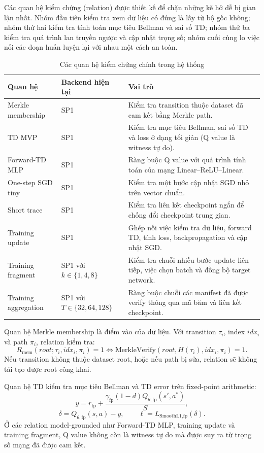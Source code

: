\documentclass[12pt,a4paper,oneside]{report}
\begin{document}
Các quan hệ kiểm chứng (relation) được thiết kế để chặn những kẽ hở dễ bị gian lận nhất. Nhóm đầu tiên kiểm tra xem dữ liệu có đúng là lấy từ bộ gốc không; nhóm thứ hai kiểm tra tính toán mục tiêu Bellman và sai số TD; nhóm thứ ba kiểm tra quá trình lan truyền ngược và cập nhật trọng số; nhóm cuối cùng lo việc nối các đoạn huấn luyện lại với nhau một cách an toàn.

\begin{table}[H]
\centering
\caption{Các quan hệ kiểm chứng chính trong hệ thống}
\begin{tabularx}{\textwidth}{p{} p{} p{}}
\toprule
Quan hệ & Backend hiện tại & Vai trò \\
\midrule
Merkle membership & SP1 & Kiểm tra transition thuộc dataset đã cam kết bằng Merkle path. \\
TD MVP & SP1 & Kiểm tra mục tiêu Bellman, sai số TD và loss ở dạng tối giản (Q value là witness tự do). \\
Forward-TD MLP & SP1 & Ràng buộc Q value với quá trình tính toán của mạng Linear--ReLU--Linear. \\
One-step SGD tiny & SP1 & Kiểm tra một bước cập nhật SGD nhỏ trên vector chuẩn. \\
Short trace & SP1 & Kiểm tra liên kết checkpoint ngắn để chống đổi checkpoint trung gian. \\
Training update & SP1 & Ghép nối việc kiểm tra dữ liệu, forward TD, tính loss, backpropagation và cập nhật SGD. \\
Training fragment & SP1 với \(k \in \{1,4,8\}\) & Kiểm tra chuỗi nhiều bước update liên tiếp, việc chọn batch và đồng bộ target network. \\
Training aggregation & SP1 với \(T \in \{32,64,128\}\) & Ràng buộc chuỗi các manifest đã được verify thông qua mã băm và liên kết checkpoint. \\
\bottomrule
\end{tabularx}
\end{table}

Quan hệ Merkle membership là điểm vào của dữ liệu. Với transition \(\tau_i\), index \(idx_i\) và path \(\pi_i\), relation kiểm tra:
\[
R_{\text{mem}}(root;\tau_i,idx_i,\pi_i)=1
\Longleftrightarrow
\text{MerkleVerify}(root,H(\tau_i),idx_i,\pi_i)=1.
\]
Nếu transition không thuộc dataset root, hoặc nếu path bị sửa, relation sẽ không tái tạo được root công khai.

Quan hệ TD kiểm tra mục tiêu Bellman và TD error trên fixed-point arithmetic:
\[
y = r_{\text{fp}} +
\frac{\gamma_{\text{fp}}(1-d)Q_{\bar{\theta},\text{fp}}(s',a^*)}{S},
\]
\[
\delta = Q_{\theta,\text{fp}}(s,a)-y,
\qquad
\ell = L_{\text{SmoothL1},\text{fp}}(\delta).
\]
Ở các relation model-grounded như Forward-TD MLP, training update và training fragment, Q value không còn là witness tự do mà được suy ra từ trọng số mạng đã được cam kết.
\end{document}
